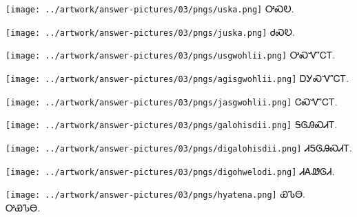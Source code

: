 \documentclass[avery5371,frame]{flashcards}%
\begin{document}
\begin{flashcard}{
\texttt{[image: ../artwork/answer-pictures/03/pngs/uska.png]}
}\Huge ᎤᏍᎧ.
\end{flashcard}

\begin{flashcard}{
\texttt{[image: ../artwork/answer-pictures/03/pngs/juska.png]}
}\Huge ᏧᏍᎧ.
\end{flashcard}

\begin{flashcard}{
\texttt{[image: ../artwork/answer-pictures/03/pngs/usgwohlii.png]}
}\Huge ᎤᏍᏉᏟᎢ.
\end{flashcard}

\begin{flashcard}{
\texttt{[image: ../artwork/answer-pictures/03/pngs/agisgwohlii.png]}
}\Huge ᎠᎩᏍᏉᏟᎢ.
\end{flashcard}

\begin{flashcard}{
\texttt{[image: ../artwork/answer-pictures/03/pngs/jasgwohlii.png]}
}\Huge ᏣᏍᏉᏟᎢ.
\end{flashcard}

\begin{flashcard}{
\texttt{[image: ../artwork/answer-pictures/03/pngs/galohisdii.png]}
}\Huge ᎦᎶᎯᏍᏗᎢ.
\end{flashcard}

\begin{flashcard}{
\texttt{[image: ../artwork/answer-pictures/03/pngs/digalohisdii.png]}
}\Huge ᏗᎦᎶᎯᏍᏗᎢ.
\end{flashcard}

\begin{flashcard}{
\texttt{[image: ../artwork/answer-pictures/03/pngs/digohwelodi.png]}
}\Huge ᏗᎪᏪᎶᏗ.
\end{flashcard}

\begin{flashcard}{
\texttt{[image: ../artwork/answer-pictures/03/pngs/hyatena.png]}
}\Huge ᏯᏖᎾ.\\ᎤᏯᏖᎾ.
\end{flashcard}
\end{document}
